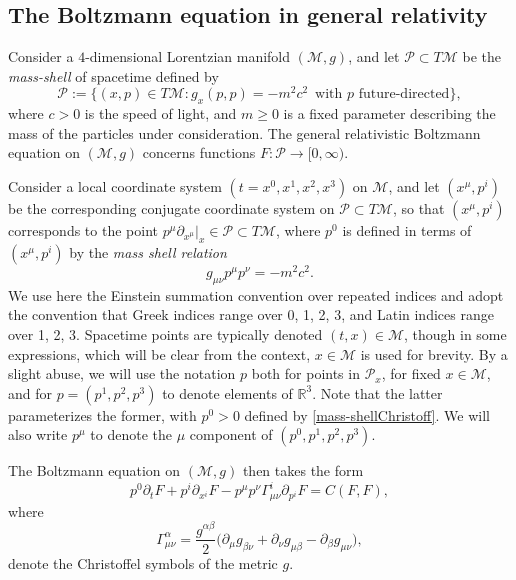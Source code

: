 \documentclass[reqno]{amsart}
\theoremstyle{definition}
\numberwithin{equation}{section}
\numberwithin{theorem}{section}
\begin{document}
\subsection{The Boltzmann equation in general relativity}

Consider a \(4\)-dimensional Lorentzian manifold \((\mathcal{M},g)\), and let \(\mathcal{P}\subset T\mathcal{M}\) be the \emph{mass-shell} of spacetime defined by 
\[\mathcal{P}:=\big\{(x,p)\in T\mathcal{M}: g_x(p,p)=-m^2c^2\,\,\, \text{with $p$ future-directed} \big\},\] where \(c>0\) is the speed of light, and \(m\geq 0\) is a fixed parameter describing the mass of the particles under consideration.  The general relativistic Boltzmann equation on \((\mathcal{M},g)\) concerns functions $F\colon \mathcal{P} \to [0,\infty)$.

Consider a local coordinate system \((t=x^0, x^1, x^2 , x^3)\) on \(\mathcal{M}\), and let \((x^{\mu},p^{i})\) be the corresponding conjugate coordinate system on \(\mathcal{P} \subset T\mathcal{M}\), so that \((x^{\mu},p^{i})\) corresponds to the point \(p^{\mu}\partial_{x^{\mu}}|_{x}\in \mathcal{P} \subset T\mathcal{M}\), where $p^0$ is defined in terms of \((x^{\mu},p^{i})\) by the \emph{mass shell relation}
\begin{equation}\label{mass-shellChristoff}
    g_{\mu \nu} p^{\mu} p^{\nu} = -m^2c^2.
\end{equation}
We use here the Einstein summation convention over repeated indices and adopt the convention that Greek indices range over 0, 1, 2, 3, and Latin indices range over 1, 2, 3.  Spacetime points are typically denoted $(t,x) \in \mathcal{M}$, though in some expressions, which will be clear from the context, $x\in \mathcal{M}$ is used for brevity.  By a slight abuse, we will use the notation $p$ both for points in $\mathcal{P}_x$, for fixed $x\in \mathcal{M}$, and for $p=(p^1,p^2,p^3)$ to denote elements of $\mathbb{R}^3$.  Note that the latter parameterizes the former, with $p^0>0$ defined by \eqref{mass-shellChristoff}.  We will also write $p^{\mu}$ to denote the $\mu$ component of  $(p^0, p^1, p^2, p^3)$.

The Boltzmann equation on \((\mathcal{M},g)\) then takes the form 
\begin{equation}\label{genrelatbolzt}
p^0\partial_t F+p^i\partial_{x^i}F-p^{\mu} p^{\nu}\Gamma_{\mu\nu}^i\partial_{p^i}F=C(F,F),    
\end{equation}
where
\[
	\Gamma_{\mu \nu}^{\alpha} = \frac{g^{\alpha \beta}}{2} \big( \partial_{\mu}g_{\beta \nu} + \partial_{\nu}g_{\mu \beta} -  \partial_{\beta}g_{\mu \nu} \big),
\]
denote the Christoffel symbols of the metric \(g\).
\end{document}
